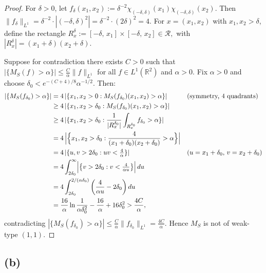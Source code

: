 \documentclass[12pt]{article}
\begin{document}
\begin{proof}
For $\delta>0$, let $f_\delta(x_1,x_2):=\delta^{-2}\chi_{(-\delta,\delta)}(x_1)\chi_{(-\delta,\delta)}(x_2)$. Then $\|f_\delta\|_{L^1} = \delta^{-2}\cdot|(-\delta,\delta)^2| = \delta^{-2}\cdot(2\delta)^2 = 4.$
For $x=(x_1,x_2)$ with $x_1,x_2>\delta$, define the rectangle $R_x^\delta := [-\delta,\,x_1]\times[-\delta,\,x_2] \in \mathcal{R},$
with $|R_x^\delta| = (x_1+\delta)(x_2+\delta)$.

Suppose for contradiction there exists $C>0$ such that $|\{M_S(f)>\alpha\}|\leq\frac{C}{\alpha}\|f\|_{L^1}$
for all $f\in L^1(\mathbb{R}^2)$ and $\alpha>0$. Fix $\alpha>0$ and choose $\delta_0 < e^{-(C+4)/8}\alpha^{-1/2}$. Then:
\begin{align*}
  |\{M_S(f_{\delta_0})>\alpha\}|
  &= 4\,|\{x_1,x_2>0 : M_S(f_{\delta_0})(x_1,x_2)>\alpha\}|
  &&\text{(symmetry, 4 quadrants)} \\
  &\geq 4\,|\{x_1,x_2>\delta_0 : M_S(f_{\delta_0})(x_1,x_2)>\alpha\}| \\
  &\geq 4\,|\{x_1,x_2>\delta_0 : \frac{1}{|R_x^{\delta_0}|}\int_{R_x^{\delta_0}} f_{\delta_0}>\alpha\}| \\
  &= 4\,\Bigl|\Bigl\{x_1,x_2>\delta_0 : \frac{4}{(x_1+\delta_0)(x_2+\delta_0)}>\alpha\Bigr\}\Bigr| \\
    &= 4\,|\{u,v>2\delta_0:uv<\tfrac{4}{\alpha}\}|
    &&\text{($u=x_1+\delta_0$, $v=x_2+\delta_0$)} \\
  &= 4\int_{2\delta_0}^{\infty} \Bigl|\bigl\{v>2\delta_0 : v<\tfrac{4}{\alpha u}\bigr\}\Bigr|\,du\\
  &= 4\int_{2\delta_0}^{2/(\alpha\delta_0)}\left(\frac{4}{\alpha u}-2\delta_0\right)du\\
  &= \frac{16}{\alpha}\ln\frac{1}{\alpha\delta_0^2} - \frac{16}{\alpha} + 16\delta_0^2
  > \frac{4C}{\alpha},
\end{align*}
contradicting $|\{M_S(f_{\delta_0})>\alpha\}|\leq\frac{C}{\alpha}\|f_{\delta_0}\|_{L^1}=\frac{4C}{\alpha}$. Hence $M_S$ is not of weak-type $(1,1)$.
\end{proof}

\subsection*{(b)}
\end{document}
